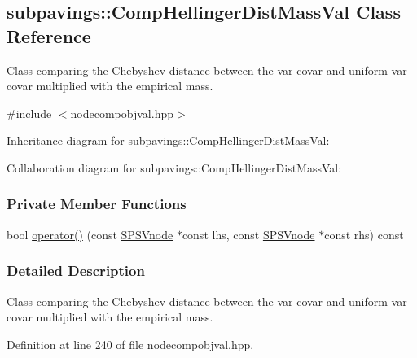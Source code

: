 \hypertarget{classsubpavings_1_1CompHellingerDistMassVal}{\subsection{subpavings\-:\-:\-Comp\-Hellinger\-Dist\-Mass\-Val \-Class \-Reference}
\label{classsubpavings_1_1CompHellingerDistMassVal}
}


\-Class comparing the \-Chebyshev distance between the var-\/covar and uniform var-\/covar multiplied with the empirical mass.  




{\ttfamily \#include $<$nodecompobjval.\-hpp$>$}



\-Inheritance diagram for subpavings\-:\-:\-Comp\-Hellinger\-Dist\-Mass\-Val\-:


\-Collaboration diagram for subpavings\-:\-:\-Comp\-Hellinger\-Dist\-Mass\-Val\-:
\subsubsection*{\-Private \-Member \-Functions}
\begin{DoxyCompactItemize}
\item 
bool \hyperlink{classsubpavings_1_1CompHellingerDistMassVal_a5a4bfd7d512e5333fde6e8edea6bb1da}{operator()} (const \hyperlink{classsubpavings_1_1SPSVnode}{\-S\-P\-S\-Vnode} $\ast$const lhs, const \hyperlink{classsubpavings_1_1SPSVnode}{\-S\-P\-S\-Vnode} $\ast$const rhs) const 
\end{DoxyCompactItemize}


\subsubsection{\-Detailed \-Description}
\-Class comparing the \-Chebyshev distance between the var-\/covar and uniform var-\/covar multiplied with the empirical mass. 

\-Definition at line 240 of file nodecompobjval.\-hpp.




